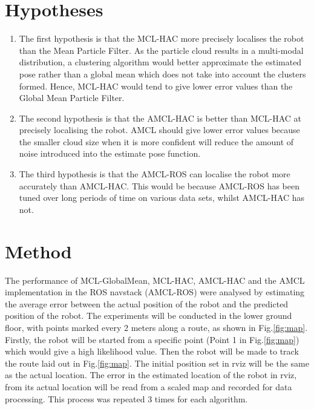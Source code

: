 \documentclass[a4paper, 10pt, conference]{ieeeconf}      %
\begin{document}
\section{Hypotheses}
\begin{enumerate}

\item The first hypothesis is that the MCL-HAC more precisely localises the robot than the Mean Particle Filter. As the particle cloud results in a multi-modal distribution, a clustering algorithm would better approximate the estimated pose rather than a global mean which does not take into account the clusters formed. Hence, MCL-HAC would tend to give lower error values than the Global Mean Particle Filter.

\item The second hypothesis is that the AMCL-HAC is better than MCL-HAC at precisely localising the robot. AMCL should give lower error values because the smaller cloud size when it is more confident will reduce the amount of noise introduced into the estimate pose function.

\item The third hypothesis is that the AMCL-ROS can localise the robot more accurately than AMCL-HAC. This would be because AMCL-ROS has been tuned over long periods of time on various data sets, whilst AMCL-HAC has not.
 
\end{enumerate}
\section{Method}

The performance of MCL-GlobalMean, MCL-HAC, AMCL-HAC and the AMCL implementation in the ROS navstack (AMCL-ROS) were analysed by estimating the average error between the actual position of the robot and the predicted position of the robot. 
The experiments will be conducted in the lower ground floor, with points marked every 2 meters along a route, as shown in Fig.\ref{fig:map}. Firstly, the robot will be started from a specific point (Point 1 in Fig.\ref{fig:map}) which would give a high likelihood value. Then the robot will be made to track the route laid out in Fig.\ref{fig:map}. The initial position set in rviz will be the same as the actual location. The error in the estimated location of the robot in rviz, from its actual location will be read from a scaled map and recorded for data processing. This process was repeated 3 times for each algorithm.
\end{document}
